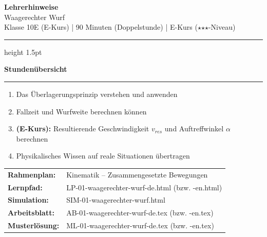 \documentclass[11pt, a4paper]{article}
\newcommand{\stmark}{$\star$}
\newcommand{\fachfarbe}{physik}
\newcommand{\thema}{Waagerechter Wurf}
\newcommand{\klasse}{Klasse 10E (E-Kurs)}
\newcommand{\zeit}{90 Minuten (Doppelstunde)}
\newcommand{\abschnitt}[1]{%
    \vspace{12pt}
    \noindent\textbf{\large\textcolor{\fachfarbe}{#1}}
    \vspace{6pt}
    \hrule
    \vspace{8pt}
}
\begin{document}

\begin{center}
{\LARGE\bfseries Lehrerhinweise}\\[4pt]
{\Large\textcolor{\fachfarbe}{\thema}}\\[8pt]
{\normalsize \klasse{} | \zeit{} | E-Kurs (\stmark\stmark\stmark-Niveau)}
\end{center}

\vspace{4pt}
\hrule height 1.5pt
\vspace{12pt}


\abschnitt{Stundenübersicht}

\begin{infobox}
\begin{enumerate}
    \item Das Überlagerungsprinzip verstehen und anwenden
    \item Fallzeit und Wurfweite berechnen können
    \item \textbf{(E-Kurs):} Resultierende Geschwindigkeit $v_{res}$ und Auftreffwinkel $\alpha$ berechnen
    \item Physikalisches Wissen auf reale Situationen übertragen
\end{enumerate}
\end{infobox}

\vspace{8pt}

\begin{tabular}{llp{8cm}}
\textbf{Rahmenplan:} & \multicolumn{2}{l}{Kinematik -- Zusammengesetzte Bewegungen} \\
\textbf{Lernpfad:} & \multicolumn{2}{l}{LP-01-waagerechter-wurf-de.html (bzw. -en.html)} \\
\textbf{Simulation:} & \multicolumn{2}{l}{SIM-01-waagerechter-wurf.html} \\
\textbf{Arbeitsblatt:} & \multicolumn{2}{l}{AB-01-waagerechter-wurf-de.tex (bzw. -en.tex)} \\
\textbf{Musterlösung:} & \multicolumn{2}{l}{ML-01-waagerechter-wurf-de.tex (bzw. -en.tex)} \\
\end{tabular}
\end{document}
